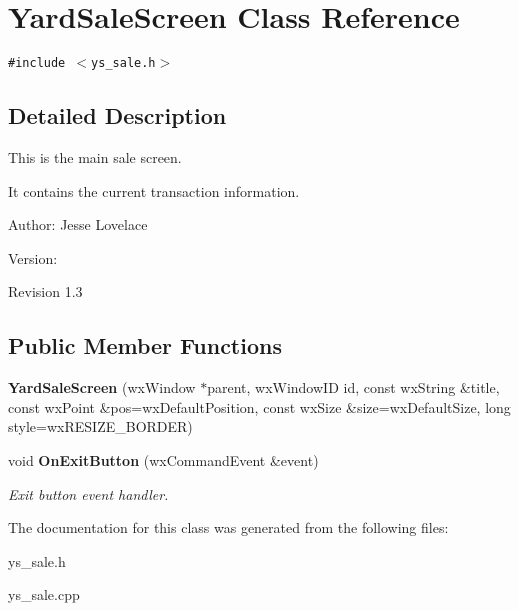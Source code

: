 \section{Yard\-Sale\-Screen Class Reference}
\label{classYardSaleScreen}
{\tt \#include $<$ys\_\-sale.h$>$}



\subsection{Detailed Description}
This is the main sale screen. 

It contains the current transaction information. \begin{Desc}
\item[Author:]Jesse Lovelace \end{Desc}
\begin{Desc}
\item[Version:]\begin{Desc}
\item[Revision]1.3 \end{Desc}
\end{Desc}


\subsection*{Public Member Functions}
\begin{CompactItemize}
\item 
{\bf Yard\-Sale\-Screen} (wx\-Window $\ast$parent, wx\-Window\-ID id, const wx\-String \&title, const wx\-Point \&pos=wx\-Default\-Position, const wx\-Size \&size=wx\-Default\-Size, long style=wx\-RESIZE\_\-BORDER)\label{classYardSaleScreen_a0}

\item 
void {\bf On\-Exit\-Button} (wx\-Command\-Event \&event)\label{classYardSaleScreen_a2}

\begin{CompactList}\small\item\em Exit button event handler. \item\end{CompactList}\end{CompactItemize}


The documentation for this class was generated from the following files:\begin{CompactItemize}
\item 
ys\_\-sale.h\item 
ys\_\-sale.cpp\end{CompactItemize}
